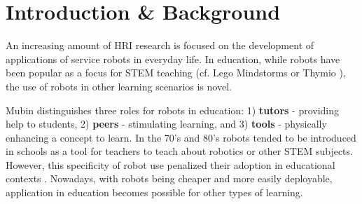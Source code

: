 \documentclass{sig-alternate-05-2015}
\begin{document}
%
%
%

%
%

%
%


\section{Introduction \& Background}
An increasing amount of HRI research is focused on the development of applications of service robots in everyday life. 
In education, while robots have been popular as a focus for STEM 
teaching (cf. Lego Mindstorms or Thymio \cite{riedo2012two}), the use of robots in other learning scenarios is novel. 

Mubin \cite{mubin2013review} distinguishes three roles for robots in education:
1) \textbf{tutors} - providing help to students, 2) \textbf{peers} - stimulating learning, and 3) \textbf{tools} - physically enhancing a concept to learn.
In the 70's and 80's robots tended to be introduced in schools as a tool for teachers to teach about robotics or other STEM subjects. 
However, this specificity of robot use penalized their adoption in educational contexts \cite{gander2013informatics}. 
Nowadays, with robots being cheaper and more easily deployable, application in education becomes possible for other types of learning.  
\end{document}
